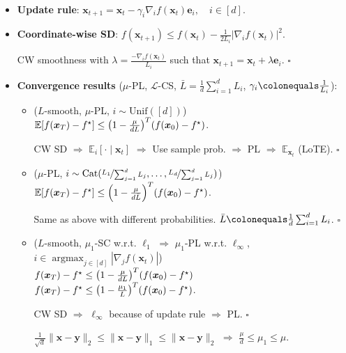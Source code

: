\documentclass[8pt,a4paper]{extarticle}
\renewcommand{\proof}[1]{\begin{tcolorbox}#1 \hfill $\square$\end{tcolorbox}}
\DeclareMathOperator*{\argmax}{argmax}
\newcommand{\lft}{\mathopen{}\mathclose\bgroup\left}
\newcommand{\rgt}{\aftergroup\egroup\right}
\newcommand{\E}{\mathbb{E}}
\renewcommand{\vec}[1]{\bm{#1}}
\newenvironment{topic}[1]
{\textbf{\sffamily \colorbox{black}{\rlap{\textbf{\textcolor{white}{#1}}}\hspace{\linewidth}\hspace{-2\fboxsep}}} \\ \vspace{0.2cm}}
{}
\begin{document}
\begin{multicols*}{2}
    \begin{topic}{Coordinate descent}
        \begin{itemize}
            \item \textbf{Update rule}: $\vec{x}_{t+1} = \vec{x}_t - \gamma_i \nabla_i f(\vec{x}_t) \vec{e}_i, \quad i \in [d]$.
            \item \textbf{Coordinate-wise SD}: $f(\vec{x}_{t+1}) \leq f(\vec{x}_t) - \frac{1}{2L_i} |\nabla_i f(\vec{x}_t)|^2$.
                  \proof{CW smoothness with $\lambda = \frac{-\nabla_i f(\vec{x}_t)}{L_i}$ such that $\vec{x}_{t+1} = \vec{x}_t + \lambda \vec{e}_i$.}
            \item \textbf{Convergence results} ($\mu$-PL, $\mathcal{L}$-CS, $\bar{L} = \frac{1}{d} \sum_{i=1}^{d} L_i$, $\gamma_i \colonequals \frac{1}{L_i}$):
                  \begin{itemize}
                      \item ($L$-smooth, $\mu$-PL, $i \sim \mathrm{Unif}([d])$) \\
                            $\E[f(\vec{x}_T) - f^\star] \leq \lft( 1 - \frac{\mu}{dL} \rgt)^T(f(\vec{x}_0) - f^\star)$.
                            \proof{CW SD $\Rightarrow$ $\E_i[\cdot \mid \vec{x}_t]$ $\Rightarrow$ Use sample prob. $\Rightarrow$ PL $\Rightarrow$ $\E_{\vec{x}_t}$ (LoTE).}
                      \item ($\mu$-PL, $i \sim \mathrm{Cat}(\nicefrac{L_1}{\sum_{j=1}^{d} L_j}, \ldots, \nicefrac{L_d}{\sum_{j=1}^{d} L_j})$) \\
                            $\E[f(\vec{x}_T) - f^\star] \leq \lft( 1 - \frac{\mu}{d \bar{L}} \rgt)^T (f(\vec{x}_0) - f^\star)$.
                            \proof{Same as above with different probabilities. $\bar{L} \colonequals \frac{1}{d} \sum_{i=1}^{d} L_i$.}
                      \item ($L$-smooth, $\mu_1$-SC w.r.t. $\ell_1$ $\Rightarrow$ $\mu_1$-PL w.r.t. $\ell_{\infty}$, $i \in \argmax_{j\in[d]} |\nabla_j f(\vec{x}_t)|$) \\
                            $f(\vec{x}_T) - f^\star \leq \lft( 1 - \frac{\mu}{dL} \rgt)^T (f(\vec{x}_0) - f^\star)$ \\
                            $f(\vec{x}_T) - f^\star \leq \lft( 1 - \frac{\mu_1}{L} \rgt)^T (f(\vec{x}_0) - f^\star)$.
                            \proof{CW SD $\Rightarrow$ $\ell_{\infty}$ because of update rule $\Rightarrow$ PL.}
                            $\frac{1}{\sqrt{d}} \| \vec{x} - \vec{y} \|_2 \leq \| \vec{x} - \vec{y} \|_1 \leq \| \vec{x} - \vec{y} \|_2$ $\Rightarrow$ $\frac{\mu}{d} \leq \mu_1 \leq \mu$.
                  \end{itemize}
        \end{itemize}
    \end{topic}


\end{multicols*}
\end{document}
